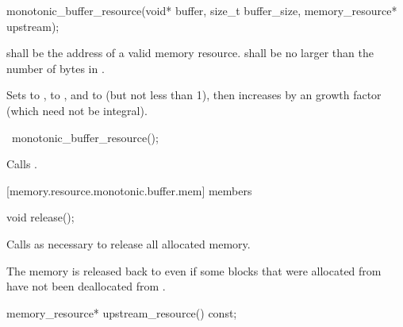 %
\begin{itemdecl}
monotonic_buffer_resource(void* buffer, size_t buffer_size, memory_resource* upstream);
\end{itemdecl}

\begin{itemdescr}
\pnum
\requires
{} shall be the address of a valid memory resource.
 shall be no larger than the number of bytes in .

\pnum
\effects
Sets  to ,
 to , and
 to  (but not less than 1),
then increases 
by an  growth factor (which need not be integral).
\end{itemdescr}

%
\begin{itemdecl}
~monotonic_buffer_resource();
\end{itemdecl}

\begin{itemdescr}
\pnum
\effects
Calls .
\end{itemdescr}


[memory.resource.monotonic.buffer.mem]{ members}

%
\begin{itemdecl}
void release();
\end{itemdecl}

\begin{itemdescr}
\pnum
\effects
Calls  as necessary
to release all allocated memory.

\pnum
\begin{note}
The memory is released back to 
even if some blocks that were allocated from 
have not been deallocated from .\end{note}
\end{itemdescr}

%
\begin{itemdecl}
memory_resource* upstream_resource() const;
\end{itemdecl}

